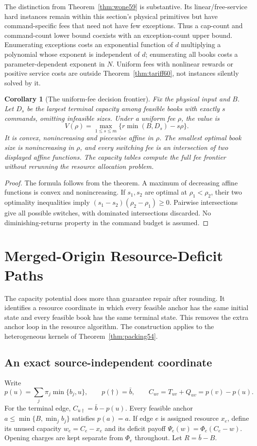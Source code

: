 \documentclass[11pt,letterpaper]{article}
\newtheorem{corollary}[theorem]{Corollary}
\theoremstyle{definition}\newtheorem{remark}[theorem]{Remark}
\begin{document}
The distinction from Theorem~\ref{thm:wone59} is substantive. Its linear/free-service hard instances remain within this section's physical primitives but have command-specific fees that need not have few exceptions. Thus a cap-count and command-count lower bound coexists with an exception-count upper bound. Enumerating exceptions costs an exponential function of $d$ multiplying a polynomial whose exponent is independent of $d$; enumerating all books costs a parameter-dependent exponent in $N$. Uniform fees with nonlinear rewards or positive service costs are outside Theorem~\ref{thm:tariff60}, not instances silently solved by it.

\begin{corollary}[The uniform-fee decision frontier]\label{cor:fee60}
Fix the physical input and $B$. Let $D_s$ be the largest terminal capacity among feasible books with exactly $s$ commands, omitting infeasible sizes. Under a uniform fee $\rho$, the value is
\[
 V(\rho)=\max_{1\leq s\leq m}\{r\min(B,D_s)-s\rho\}.
\]
It is convex, nonincreasing and piecewise affine in $\rho$. The smallest optimal book size is nonincreasing in $\rho$, and every switching fee is an intersection of two displayed affine functions. The capacity tables compute the full fee frontier without rerunning the resource allocation problem.
\end{corollary}
\begin{proof}
The formula follows from the theorem. A maximum of decreasing affine functions is convex and nonincreasing. If $s_1,s_2$ are optimal at $\rho_1<\rho_2$, their two optimality inequalities imply $(s_1-s_2)(\rho_2-\rho_1)\geq0$. Pairwise intersections give all possible switches, with dominated intersections discarded. No diminishing-returns property in the command budget is assumed.
\end{proof}
\section{Merged-Origin Resource-Deficit Paths}\label{sec:deficit56}
The capacity potential does more than guarantee repair after rounding. It identifies a resource coordinate in which every feasible anchor has the same initial state and every feasible book has the same terminal state. This removes the extra anchor loop in the resource algorithm. The construction applies to the heterogeneous kernels of Theorem~\ref{thm:packing54}.

\subsection{An exact source-independent coordinate}
Write
\[
 p(u)=\sum_j\pi_j\min\{b_j,u\},\qquad p(\dagger)=\bar b,
 \qquad C_{uv}=T_{uv}+Q_{uv}=p(v)-p(u).
\]
For the terminal edge, $C_{u\dagger}=\bar b-p(u)$. Every feasible anchor $a\leq\min\{B,\min_jb_j\}$ satisfies $p(a)=a$. If edge $e$ is assigned resource $x_e$, define its unused capacity $w_e=C_e-x_e$ and its deficit payoff $\Psi_e(w)=\Phi_e(C_e-w)$. Opening charges are kept separate from $\Phi_e$ throughout. Let $R=\bar b-B$.
\end{document}
